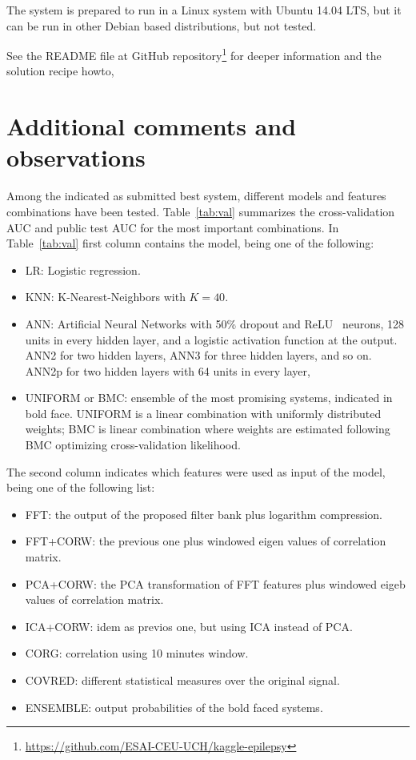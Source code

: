 \documentclass[a4paper,english,twoside]{article}
\begin{document}
The system is prepared to run in a Linux system with Ubuntu 14.04 LTS, but it
can be run in other Debian based distributions, but not tested.

See the README file at GitHub
repository\footnote{\url{https://github.com/ESAI-CEU-UCH/kaggle-epilepsy}} for
deeper information and the solution recipe howto,

\section{Additional comments and
  observations}\label{additional-comments-and-observations}

Among the indicated as submitted best system, different models and
features combinations have been tested. Table~\ref{tab:val} summarizes
the cross-validation AUC and public test AUC for the most important
combinations. In Table~\ref{tab:val} first column contains the model, being one
of the following:

\begin{itemize}
\item
  LR: Logistic regression.
\item
  KNN: K-Nearest-Neighbors with $K=40$.
\item ANN: Artificial Neural Networks with 50\% dropout and
  ReLU~\cite{2011:glorot:aistats} neurons, 128 units in every hidden layer, and
  a logistic activation function at the output.  ANN2 for two hidden layers,
  ANN3 for three hidden layers, and so on. ANN2p for two hidden layers with 64
  units in every layer,
\item
  UNIFORM or BMC: ensemble of the most promising systems, indicated in
  bold face. UNIFORM is a linear combination with uniformly distributed
  weights; BMC is linear combination where weights are estimated
  following BMC optimizing cross-validation likelihood.
\end{itemize}

The second column indicates which features were used as input of the
model, being one of the following list:

\begin{itemize}
\item
  FFT: the output of the proposed filter bank plus logarithm
  compression.
\item
  FFT+CORW: the previous one plus windowed eigen values of correlation
  matrix.
\item
  PCA+CORW: the PCA transformation of FFT features plus windowed eigeb
  values of correlation matrix.
\item
  ICA+CORW: idem as previos one, but using ICA instead of PCA.
\item
  CORG: correlation using 10 minutes window.
\item
  COVRED: different statistical measures over the original signal.
\item
  ENSEMBLE: output probabilities of the bold faced systems.
\end{itemize}
\end{document}
